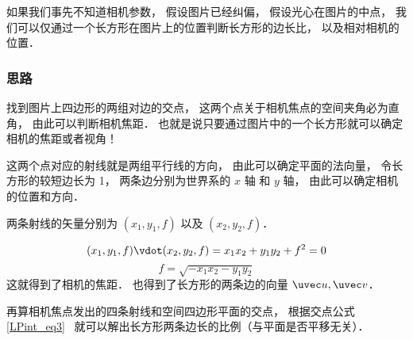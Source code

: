 
\begin{issues}
\issueDraft
\end{issues}


如果我们事先不知道相机参数， 假设图片已经纠偏， 假设光心在图片的中点， 我们可以仅通过一个长方形在图片上的位置判断长方形的边长比， 以及相对相机的位置．

\subsubsection{思路}

找到图片上四边形的两组对边的交点， 这两个点关于相机焦点的空间夹角必为直角， 由此可以判断相机焦距． 也就是说只要通过图片中的一个长方形就可以确定相机的焦距或者视角！

这两个点对应的射线就是两组平行线的方向， 由此可以确定平面的法向量， 令长方形的较短边长为 1， 两条边分别为世界系的 $x$ 轴 和 $y$ 轴， 由此可以确定相机的位置和方向．

两条射线的矢量分别为 $(x_1, y_1, f)$ 以及 $(x_2, y_2, f)$．

\begin{equation}
(x_1, y_1, f)\vdot (x_2, y_2, f) = x_1 x_2 + y_1 y_2 + f^2 = 0
\end{equation}
\begin{equation}
f = \sqrt{-x_1 x_2 - y_1 y_2}
\end{equation}
这就得到了相机的焦距． 也得到了长方形的两条边的向量 $\uvec u, \uvec v$．

再算相机焦点发出的四条射线和空间四边形平面的交点， 根据交点公式\autoref{LPint_eq3}~ 就可以解出长方形两条边长的比例（与平面是否平移无关）．

